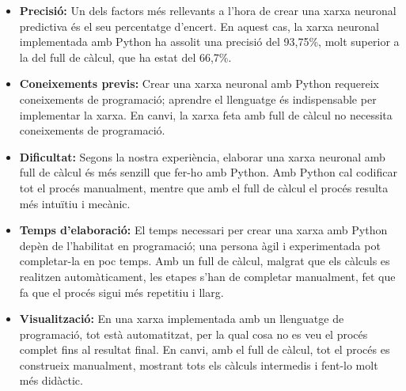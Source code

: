 \begin{itemize}

\item \textbf{Precisió:} Un dels factors més rellevants a l’hora de crear una xarxa neuronal predictiva és el seu percentatge d’encert. En aquest cas, la xarxa neuronal implementada amb Python ha assolit una precisió del 93,75\%, molt superior a la del full de càlcul, que ha estat del 66,7\%.

\item \textbf{Coneixements previs:} Crear una xarxa neuronal amb Python requereix coneixements de programació; aprendre el llenguatge és indispensable per implementar la xarxa. En canvi, la xarxa feta amb full de càlcul no necessita coneixements de programació.

\item \textbf{Dificultat:} Segons la nostra experiència, elaborar una xarxa neuronal amb full de càlcul és més senzill que fer-ho amb Python. Amb Python cal codificar tot el procés manualment, mentre que amb el full de càlcul el procés resulta més intuïtiu i mecànic.

\item \textbf{Temps d’elaboració:} El temps necessari per crear una xarxa amb Python depèn de l’habilitat en programació; una persona àgil i experimentada pot completar-la en poc temps. Amb un full de càlcul, malgrat que els càlculs es realitzen automàticament, les etapes s’han de completar manualment, fet que fa que el procés sigui més repetitiu i llarg.

\item \textbf{Visualització:} En una xarxa implementada amb un llenguatge de programació, tot està automatitzat, per la qual cosa no es veu el procés complet fins al resultat final. En canvi, amb el full de càlcul, tot el procés es construeix manualment, mostrant tots els càlculs intermedis i fent-lo molt més didàctic.

\end{itemize}


